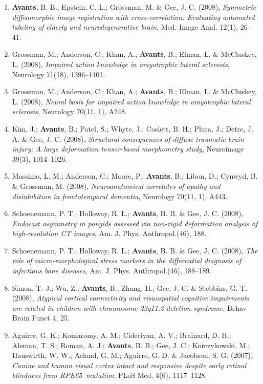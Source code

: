 \documentclass[11pt]{moderncv} %
\begin{document}
\begin{enumerate}
\item  \textbf{Avants}, B. B.; Epstein, C. L.; Grossman, M. \&  Gee, J. C. (2008), \textit{Symmetric diffeomorphic image registration with cross-correlation: Evaluating automated labeling of elderly and neurodegenerative brain}, Med. Image Anal. 12(1), 26--41.

\item  Grossman, M.; Anderson, C.; Khan, A.; \textbf{Avants}, B.; Elman, L. \&  McCluskey, L. (2008), \textit{Impaired action knowledge in amyotrophic lateral sclerosis}, Neurology 71(18), 1396--1401.

\item  Grossman, M.; Anderson, C.; Khan, A.; \textbf{Avants}, B.; Elman, L. \&  McCluskey, L. (2008), \textit{Neural basis for impaired action knowledge in amyotrophic lateral sclerosis}, Neurology 70(11, 1), A248.

\item  Kim, J.; \textbf{Avants}, B.; Patel, S.; Whyte, J.; Coslett, B. H.; Pluta, J.; Detre, J. A. \&  Gee, J. C. (2008), \textit{Structural consequences of diffuse traumatic brain injury: A large deformation tensor-based morphometry study}, Neuroimage 39(3), 1014--1026.

\item  Massimo, L. M.; Anderson, C.; Moore, P.; \textbf{Avants}, B.; Libon, D.; Cynwyd, B. \&  Grossman, M. (2008), \textit{Neuroanatomical correlates of apathy and disinhibition in frontotemporal dementia}, Neurology 70(11, 1), A443.

\item  Schoenemann, P. T.; Holloway, R. L.; \textbf{Avants}, B. B. \&  Gee, J. C. (2008), \textit{Endocast asymmetry in pongids assessed via non-rigid deformation analysis of high-resolution CT images}, Am. J. Phys. Anthropol.(46), 188.

\item  Schoenemann, P. T.; Holloway, R. L.; \textbf{Avants}, B. B. \&  Gee, J. C. (2008), \textit{The role of micro-morphological stress markers in the differential diagnosis of infectious bone diseases}, Am. J. Phys. Anthropol.(46), 188--189.

\item  Simon, T. J.; Wu, Z.; \textbf{Avants}, B.; Zhang, H.; Gee, J. C. \&  Stebbins, G. T. (2008), \textit{Atypical cortical connectivity and visuospatial cognitive impairments are related in children with chromosome 22q11.2 deletion syndrome}, Behav Brain Funct 4, 25.

\item  Aguirre, G. K.; Komaromy, A. M.; Cideciyan, A. V.; Brainard, D. H.; Aleman, T. S.; Roman, A. J.; \textbf{Avants}, B. B.; Gee, J. C.; Korczykowski, M.; Hauswirth, W. W.; Acland, G. M.; Aguirre, G. D. \&  Jacobson, S. G. (2007), \textit{Canine and human visual cortex intact and responsive despite early retinal blindness from RPE65~mutation}, PLoS Med. 4(6), 1117--1128.


\end{enumerate}
\end{document}
